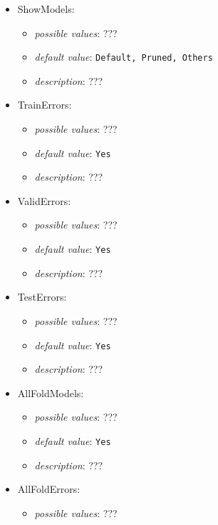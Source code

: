 \documentclass{article}
\begin{document}
\begin{itemize}
    \item ShowModels:
           \begin{itemize}
                \item \emph{possible values}: ???
                \item \emph{default value}: \texttt{{Default}, \texttt{Pruned}, \texttt{Others}}
                \item \emph{description}: ???
           \end{itemize}
    \item TrainErrors:
           \begin{itemize}
                \item \emph{possible values}: ???
                \item \emph{default value}: \texttt{Yes}
                \item \emph{description}: ???
           \end{itemize}
    \item ValidErrors:
           \begin{itemize}
                \item \emph{possible values}: ???
                \item \emph{default value}: \texttt{Yes}
                \item \emph{description}: ???
           \end{itemize}
    \item TestErrors:
           \begin{itemize}
                \item \emph{possible values}: ???
                \item \emph{default value}: \texttt{Yes}
                \item \emph{description}: ???
           \end{itemize}
    \item AllFoldModels:
           \begin{itemize}
                \item \emph{possible values}: ???
                \item \emph{default value}: \texttt{Yes}
                \item \emph{description}: ???
           \end{itemize}
    \item AllFoldErrors:
           \begin{itemize}
                \item \emph{possible values}: ???

\end{itemize}
\end{itemize}
\end{document}
